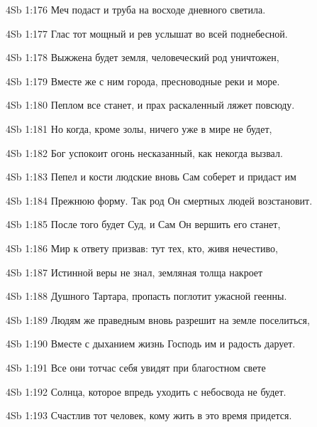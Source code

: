 \vs 4Sb 1:176 Меч подаст и труба на восходе дневного светила. 

\vs 4Sb 1:177 Глас тот мощный и рев услышат во всей поднебесной. 

\vs 4Sb 1:178 Выжжена будет земля, человеческий род уничтожен, 

\vs 4Sb 1:179 Вместе же с ним города, пресноводные реки и море. 

\vs 4Sb 1:180 Пеплом все станет, и прах раскаленный ляжет повсюду.

\vs 4Sb 1:181 Но когда, кроме золы, ничего уже в мире не будет, 

\vs 4Sb 1:182 Бог успокоит огонь несказанный, как некогда вызвал.

\vs 4Sb 1:183 Пепел и кости людские вновь Сам соберет и придаст им

\vs 4Sb 1:184 Прежнюю форму. Так род Он смертных людей возстановит.

\vs 4Sb 1:185 После того будет Суд, и Сам Он вершить его станет,

\vs 4Sb 1:186 Мир к ответу призвав: тут тех, кто, живя нечестиво, 

\vs 4Sb 1:187 Истинной веры не знал, земляная толща накроет

\vs 4Sb 1:188 Душного Тартара, пропасть поглотит ужасной геенны.

\vs 4Sb 1:189 Людям же праведным вновь разрешит на земле поселиться,

\vs 4Sb 1:190 Вместе с дыханием жизнь Господь им и радость дарует. 

\vs 4Sb 1:191 Все они тотчас себя увидят при благостном свете

\vs 4Sb 1:192 Солнца, которое впредь уходить с небосвода не будет.

\vs 4Sb 1:193 Счастлив тот человек, кому жить в это время придется.
